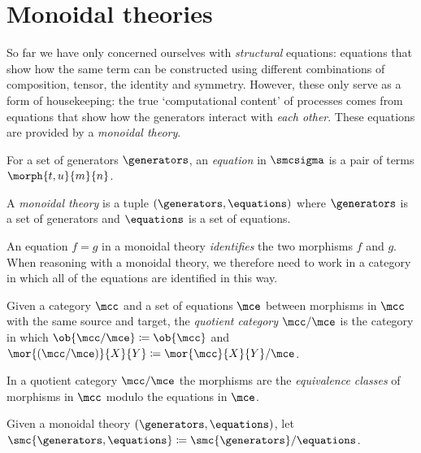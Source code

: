 \section{Monoidal theories}\label{sec:monoidal-theories}

So far we have only concerned ourselves with \emph{structural} equations:
equations that show how the same term can be constructed using different
combinations of composition, tensor, the identity and symmetry.
However, these only serve as a form of housekeeping: the true `computational
content' of processes comes from equations that show how the generators interact
with \emph{each other}.
These equations are provided by a \emph{monoidal theory}.

\begin{definition}
    For a set of generators \(\generators\), an \emph{equation} in \(\smcsigma\)
    is a pair of terms \(\morph{t,u}{m}{n}\).
\end{definition}

\begin{definition}
    A \emph{monoidal theory} is a tuple \((\generators, \equations)\) where
    \(\generators\) is a set of generators and \(\equations\) is a set of
    equations.
\end{definition}

An equation \(f = g\) in a monoidal theory \emph{identifies} the two morphisms
\(f\) and \(g\).
When reasoning with a monoidal theory, we therefore need to work in a category
in which all of the equations are identified in this way.

\begin{definition}
    Given a category \(\mcc\) and a set of equations \(\mce\) between
    morphisms in \(\mcc\) with the same source and target, the
    \emph{quotient category} \(\mcc / \mce\) is the category in which
    \(\ob{\mcc / \mce} \coloneqq \ob{\mcc}\) and \(
    \mor{(\mcc / \mce)}{X}{Y}
    \coloneqq
    \mor{\mcc}{X}{Y} / \mce
    \).
\end{definition}

In a quotient category \(\mcc / \mce\) the morphisms are the
\emph{equivalence classes} of morphisms in \(\mcc\) modulo the equations in
\(\mce\).

\begin{definition}
    Given a monoidal theory \((\generators, \equations)\), let
    \(\smc{\generators, \equations} \coloneqq \smc{\generators} / \equations\).
\end{definition}

